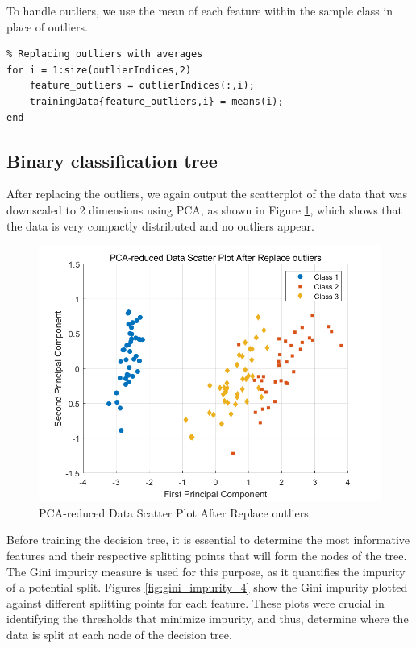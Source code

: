 \documentclass[12pt, onecolumn]{article}
\begin{document}
To handle outliers, we use the mean of each feature within the sample class in place of outliers.

\begin{verbatim}
% Replacing outliers with averages
for i = 1:size(outlierIndices,2)
    feature_outliers = outlierIndices(:,i);
    trainingData{feature_outliers,i} = means(i);
end
\end{verbatim}

\subsection{Binary classification tree}
After replacing the outliers, we again output the scatterplot of the data that was downscaled to 2 dimensions using PCA, as shown in Figure \ref{fig:remove}, which shows that the data is very compactly distributed and no outliers appear.

\begin{figure}[htbp]
\centering
\includegraphics[width=0.8\linewidth]{33.png}
\caption{PCA-reduced Data Scatter Plot After Replace outliers.}
\label{fig:remove}
\end{figure}

Before training the decision tree, it is essential to determine the most informative features and their respective splitting points that will form the nodes of the tree. The Gini impurity measure is used for this purpose, as it quantifies the impurity of a potential split. Figures \ref{fig:gini_impurity_4} show the Gini impurity plotted against different splitting points for each feature. These plots were crucial in identifying the thresholds that minimize impurity, and thus, determine where the data is split at each node of the decision tree.
\end{document}
